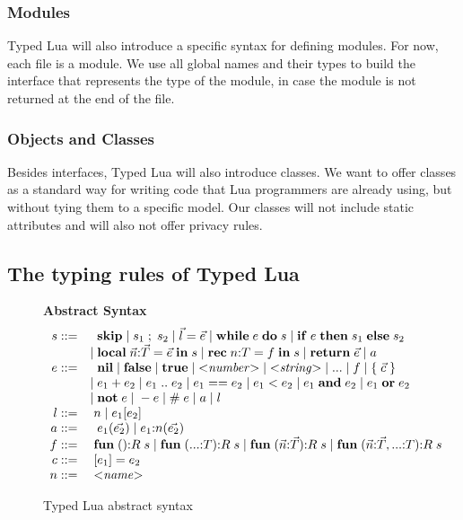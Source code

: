 \subsubsection{Modules}

Typed Lua will also introduce a specific syntax for defining modules.
For now, each file is a module.
We use all global names and their types to build the interface that
represents the type of the module, in case the module is not returned
at the end of the file.

\subsubsection{Objects and Classes}

Besides interfaces, Typed Lua will also introduce classes.
We want to offer classes as a standard way for writing code that
Lua programmers are already using, but without tying them to a
specific model.
Our classes will not include static attributes and will also not offer
privacy rules.


\subsection{The typing rules of Typed Lua}
\label{sec:rules}

\begin{figure}[!ht]
\textbf{Abstract Syntax}\\
\dstart
$$
\begin{array}{rl}
s ::= & \;\; \mathbf{skip} \; | \;
s_{1} \; ; \; s_{2} \; | \;
\vec{l} = \vec{e}  \; | \;
\mathbf{while} \; e \; \mathbf{do} \; s \; | \;
\mathbf{if} \; e \; \mathbf{then} \; s_{1} \; \mathbf{else} \; s_{2}\\
& | \; \mathbf{local} \; \vec{n}{:}\vec{T} = \vec{e} \; \mathbf{in} \; s \; | \;
\mathbf{rec} \; n{:}T = f \; \mathbf{in} \; s \; | \;
\mathbf{return} \; \vec{e} \; | \;
a\\
e ::= & \;\; \mathbf{nil} \; | \;
\mathbf{false} \; | \;
\mathbf{true} \; | \;
{<}{\it number}{>} \; | \;
{<}{\it string}{>} \; | \;
{...} \; | \;
f \; | \;
\{ \; \vec{c}\; \} \\
& | \; e_{1} + e_{2} \; | \;
e_{1} \; {..} \; e_{2} \; | \;
e_{1} == e_{2} \; | \;
e_{1} < e_{2} \; | \;
e_{1} \; \mathbf{and} \; e_{2} \; | \;
e_{1} \; \mathbf{or} \; e_{2} \\
& | \; \mathbf{not} \; e \; | \;
- e \; | \;
\# \; e \; | \;
a \; | \;
l \\
l ::= & \; n \; | \;
e_{1}[e_{2}]\\
a ::= & \;\; e_{1}(\vec{e_{2}}) \; | \;
e_{1}{:}n(\vec{e_{2}})\\
f ::= & \; \mathbf{fun} \; (){:}R \; s \; | \;
\mathbf{fun} \; ({...}{:}T){:}R \; s \; | \;
\mathbf{fun} \; (\vec{n}{:}\vec{T}){:}R \; s \; | \;
\mathbf{fun} \; (\vec{n}{:}\vec{T},{...}{:}T){:}R \; s\\
c ::= & \; [e_{1}] = e_{2}\\
n ::= & \; {<}{\it name}{>}\\
\end{array}
$$
\dend
\caption{Typed Lua abstract syntax}
\label{fig:syntax}
\end{figure}

